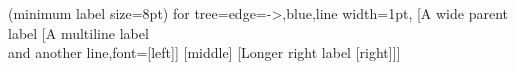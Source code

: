 \documentclass{article}
\begin{document}
\begin{fittedterminaltree}(minimum label size=8pt)
  for tree={edge={->,blue,line width=1pt}},
  [A wide parent label
    [{A multiline label\\and another line},font=\small [left]]
    [middle]
    [Longer right label [right]]]
\end{fittedterminaltree}
\begin{fittedterminaltree}\end{fittedterminaltree}
\end{document}
